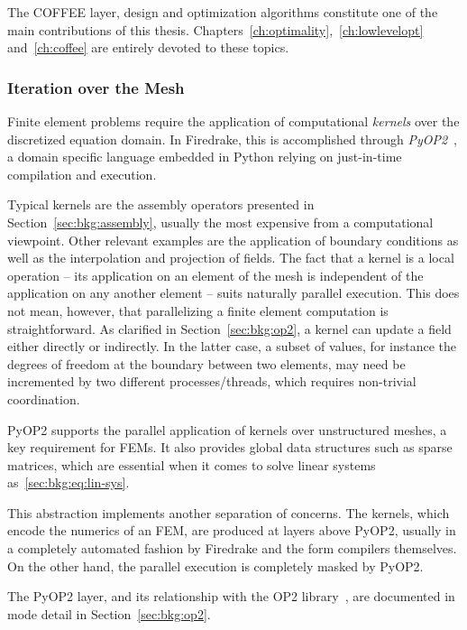 The COFFEE layer, design and optimization algorithms constitute one of the main contributions of this thesis. Chapters~\ref{ch:optimality},~\ref{ch:lowlevelopt} and~\ref{ch:coffee} are entirely devoted to these topics.

\subsubsection{Iteration over the Mesh}
\label{sec:bkg:meshiteration}
Finite element problems require the application of computational {\em kernels} over the discretized equation domain. In Firedrake, this is accomplished through {\em PyOP2}~\cite{pyop2isc}, a domain specific language embedded in Python relying on just-in-time compilation and execution. 

Typical kernels are the assembly operators presented in Section~\ref{sec:bkg:assembly}, usually the most expensive from a computational viewpoint. Other relevant examples are the application of boundary conditions as well as the interpolation and projection of fields. The fact that a kernel is a local operation -- its application on an element of the mesh is independent of the application on any another element -- suits naturally parallel execution. This does not mean, however, that parallelizing a finite element computation is straightforward. As clarified in Section~\ref{sec:bkg:op2}, a kernel can update a field either directly or indirectly. In the latter case, a subset of values, for instance the degrees of freedom at the boundary between two elements, may need be incremented by two different processes/threads, which requires non-trivial coordination.

PyOP2 supports the parallel application of kernels over unstructured meshes, a key requirement for FEMs. It also provides global data structures such as sparse matrices, which are essential when it comes to solve linear systems as~\ref{sec:bkg:eq:lin-sys}.

This abstraction implements another separation of concerns. The kernels, which encode the numerics of an FEM, are produced at layers above PyOP2, usually in a completely automated fashion by Firedrake and the form compilers themselves. On the other hand, the parallel execution is completely masked by PyOP2. 

The PyOP2 layer, and its relationship with the OP2 library~\cite{op2-main}, are documented in mode detail in Section~\ref{sec:bkg:op2}.


